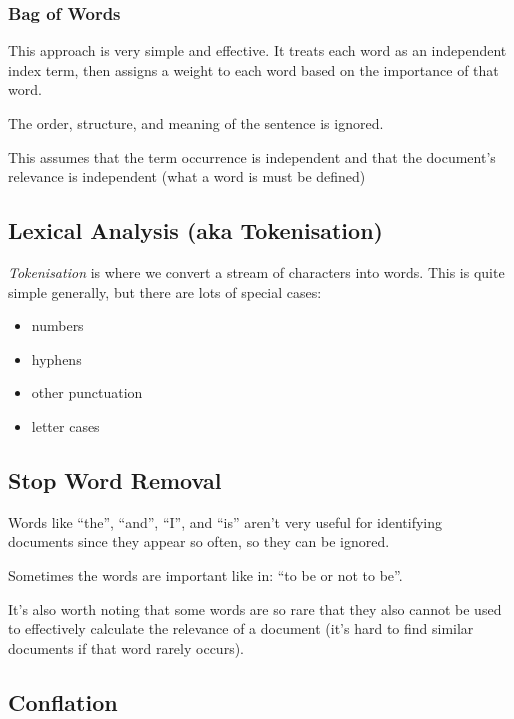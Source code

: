 \subsubsection{Bag of Words}\label{ssub:bag_of_words}

This approach is very simple and effective.
It treats each word as an independent index term, then assigns a weight to each word based on the importance of that word.
\begin{note}
    The order, structure, and meaning of the sentence is ignored.
\end{note}
This assumes that the term occurrence is independent and that the document's relevance is independent (what a word is must be defined)

\subsection{Lexical Analysis (aka Tokenisation)}\label{sub:lexical_analysis_aka_tokenisation_}

\emph{Tokenisation} is where we convert a stream of characters into words.
This is quite simple generally, but there are lots of special cases:
\begin{itemize}
    \item numbers
    \item hyphens
    \item other punctuation
    \item letter cases
\end{itemize}

\subsection{Stop Word Removal}\label{sub:stop_word_removal}

Words like ``the'', ``and'', ``I'', and ``is'' aren't very useful for identifying documents since they appear so often, so they can be ignored.
\begin{note}
    Sometimes the words are important like in: ``to be or not to be''.
\end{note}
It's also worth noting that some words are so rare that they also cannot be used to effectively calculate the relevance of a document (it's hard to find similar documents if that word rarely occurs).

\subsection{Conflation}\label{sub:conflation}

